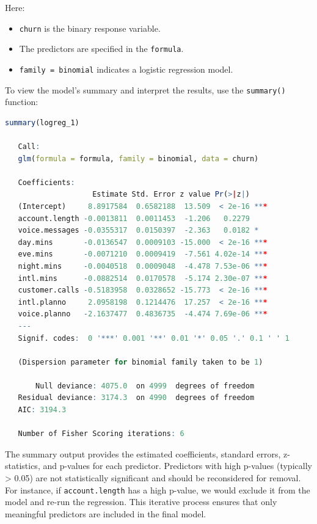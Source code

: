 \documentclass[
]{book}
\newcommand{\passthrough}[1]{#1}
\providecommand{\tightlist}{%
  \setlength{\itemsep}{0pt}\setlength{\parskip}{0pt}}
\theoremstyle{definition}
\theoremstyle{definition}
\theoremstyle{definition}
\theoremstyle{definition}
\theoremstyle{remark}
\begin{document}
Here:

\begin{itemize}
\tightlist
\item
  \passthrough{\lstinline!churn!} is the binary response variable.\\
\item
  The predictors are specified in the \passthrough{\lstinline!formula!}.\\
\item
  \passthrough{\lstinline!family = binomial!} indicates a logistic regression model.
\end{itemize}

To view the model's summary and interpret the results, use the \passthrough{\lstinline!summary()!} function:

\begin{lstlisting}[language=R]
summary(logreg_1)
   
   Call:
   glm(formula = formula, family = binomial, data = churn)
   
   Coefficients:
                    Estimate Std. Error z value Pr(>|z|)    
   (Intercept)     8.8917584  0.6582188  13.509  < 2e-16 ***
   account.length -0.0013811  0.0011453  -1.206   0.2279    
   voice.messages -0.0355317  0.0150397  -2.363   0.0182 *  
   day.mins       -0.0136547  0.0009103 -15.000  < 2e-16 ***
   eve.mins       -0.0071210  0.0009419  -7.561 4.02e-14 ***
   night.mins     -0.0040518  0.0009048  -4.478 7.53e-06 ***
   intl.mins      -0.0882514  0.0170578  -5.174 2.30e-07 ***
   customer.calls -0.5183958  0.0328652 -15.773  < 2e-16 ***
   intl.planno     2.0958198  0.1214476  17.257  < 2e-16 ***
   voice.planno   -2.1637477  0.4836735  -4.474 7.69e-06 ***
   ---
   Signif. codes:  0 '***' 0.001 '**' 0.01 '*' 0.05 '.' 0.1 ' ' 1
   
   (Dispersion parameter for binomial family taken to be 1)
   
       Null deviance: 4075.0  on 4999  degrees of freedom
   Residual deviance: 3174.3  on 4990  degrees of freedom
   AIC: 3194.3
   
   Number of Fisher Scoring iterations: 6
\end{lstlisting}

The summary output provides the estimated coefficients, standard errors, z-statistics, and p-values for each predictor. Predictors with high p-values (typically \textgreater{} 0.05) are not statistically significant and should be reconsidered for removal. For instance, if \passthrough{\lstinline!account.length!} has a high p-value, we would exclude it from the model and re-run the regression. This iterative process ensures that only meaningful predictors are included in the final model.
\end{document}
